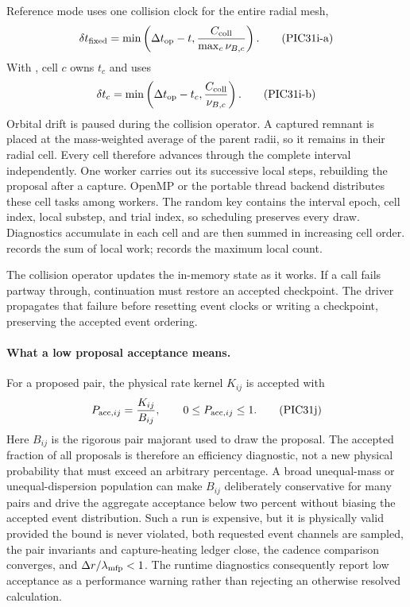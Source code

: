Reference mode uses one collision clock for the entire radial mesh,
\[
 \delta t_{\rm fixed}=\min\left(
 \Delta t_{\rm op}-t,
 \frac{C_{\rm coll}}{\max_c\nu_{B,c}}\right).           \tag{PIC31i-a}
\]
With , cell \(c\) owns \(t_c\) and
uses
\[
 \delta t_c=\min\left(
 \Delta t_{\rm op}-t_c,
 \frac{C_{\rm coll}}{\nu_{B,c}}\right).                 \tag{PIC31i-b}
\]
Orbital drift is paused during the collision operator.  A captured remnant
is placed at the mass-weighted average of the parent radii, so it remains in
their radial cell.  Every cell therefore advances through the complete
interval independently.  One worker carries out its successive local steps,
rebuilding the proposal after a capture.  OpenMP or the portable thread
backend distributes these cell tasks among workers.  The random key contains
the interval epoch, cell index, local substep, and trial index, so scheduling
preserves every draw.  Diagnostics accumulate in each cell and are then
summed in increasing cell order.   records the sum of local
work;  records the maximum local count.

The collision operator updates the in-memory state as it works.  If a call
fails partway through, continuation must restore an accepted checkpoint.
The driver propagates that failure before resetting event clocks or writing
a checkpoint, preserving the accepted event ordering.

\paragraph{What a low proposal acceptance means.}
For a proposed pair, the physical rate kernel \(K_{ij}\) is accepted with
\[
 P_{{\rm acc},ij}=\frac{K_{ij}}{B_{ij}},\qquad
 0\leq P_{{\rm acc},ij}\leq 1 .                         \tag{PIC31j}
\]
Here \(B_{ij}\) is the rigorous pair majorant used to draw the proposal.  The
accepted fraction of all proposals is therefore an efficiency diagnostic,
not a new physical probability that must exceed an arbitrary percentage.  A
broad unequal-mass or unequal-dispersion population can make \(B_{ij}\)
deliberately conservative for many pairs and drive the aggregate acceptance
below two percent without biasing the accepted event distribution.  Such a
run is expensive, but it is physically valid provided the bound is never
violated, both requested event channels are sampled, the pair invariants and
capture-heating ledger close, the cadence comparison converges, and
\(\Delta r/\lambda_{\rm mfp}<1\).  The runtime diagnostics consequently
report low acceptance as a performance warning rather than rejecting an
otherwise resolved calculation.

